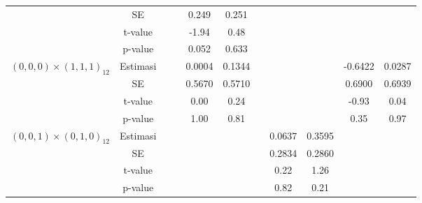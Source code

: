 \begin{enumerate}[label=\alph*.]
\begin{longtable}{|c|c|c|c|c|c|c|c|c|c|c|}
            & SE
            & {} & {}
            & {0.249} & {0.251} & {}
            & {} & {}
            & {} & {} \\ \cline{2-11}

            & t-value
            & {} & {}
            & {-1.94} & {0.48} & {}
            & {} & {}
            & {} & {} \\ \cline{2-11}

            & p-value
            & {} & {}
            & {0.052} & {0.633} & {}
            & {} & {}
            & {} & {} \\ \hline

            \multirow{4}{*}{$(0,0,0)\times(1,1,1)_{12}$}
            & Estimasi
            & {} & {}
            & {0.0004} & {0.1344} & {}
            & {} & {}
            & {-0.6422} & {0.0287} \\ \cline{2-11}

            & SE
            & {} & {}
            & {0.5670} & {0.5710} & {}
            & {} & {}
            & {0.6900} & {0.6939} \\ \cline{2-11}

            & t-value
            & {} & {}
            & {0.00} & {0.24} & {}
            & {} & {}
            & {-0.93} & {0.04} \\ \cline{2-11}

            & p-value
            & {} & {}
            & {1.00} & {0.81} & {}
            & {} & {}
            & {0.35} & {0.97} \\ \hline

            \multirow{4}{*}{$(0,0,1)\times(0,1,0)_{12}$}
            & Estimasi
            & {} & {}
            & {} & {} & {}
            & {0.0637} & {0.3595}
            & {} & {} \\ \cline{2-11}

            & SE
            & {} & {}
            & {} & {} & {}
            & {0.2834} & {0.2860}
            & {} & {} \\ \cline{2-11}

            & t-value
            & {} & {}
            & {} & {} & {}
            & {0.22} & {1.26}
            & {} & {} \\ \cline{2-11}

            & p-value
            & {} & {}
            & {} & {} & {}
            & {0.82} & {0.21}
            & {} & {} \\ \hline


\end{longtable}
\end{enumerate}
